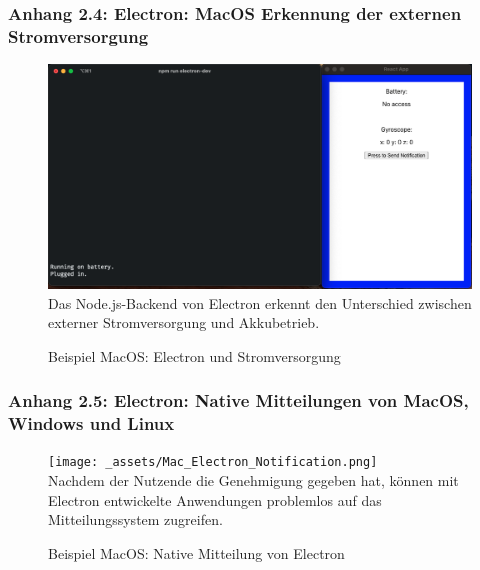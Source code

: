 \documentclass[a4paper]{scrartcl}
\begin{document}
\newpage

\subsubsection*{Anhang 2.4: Electron: MacOS Erkennung der externen Stromversorgung}

\begin{figure}[H]
	\centering
	\caption{Beispiel MacOS: Electron und Stromversorgung}
	\includegraphics[scale=0.3]{_assets/Mac_Electron_Energy.png} \\
	\justifying
	\small	
	Das Node.js-Backend von Electron erkennt den Unterschied zwischen externer Stromversorgung und Akkubetrieb.
\end{figure}

\newpage

\subsubsection*{Anhang 2.5: Electron: Native Mitteilungen von MacOS, Windows und Linux}

\begin{figure}[H]
	\centering
	\caption{Beispiel MacOS: Native Mitteilung von Electron}
	\texttt{[image: \_assets/Mac\_Electron\_Notification.png]} \\
	\justifying
	\small	
	Nachdem der Nutzende die Genehmigung gegeben hat, können mit Electron entwickelte Anwendungen problemlos auf das Mitteilungssystem zugreifen.
\end{figure}
\end{document}
